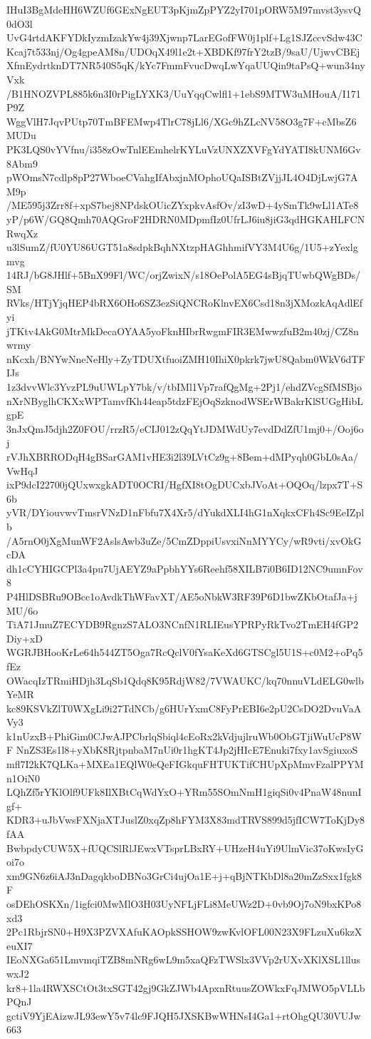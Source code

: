 IHuI3BgMdeHH6WZUf6GExNgEUT3pKjmZpPYZ2yI701pORW5M97mvst3ysvQ0dO3l
UvG4rtdAKFYDkIyzmIzakYw4j39Xjwnp7LarEGofFW0j1plf+Lg1SJZccvSdw43C
Kcaj7t533nj/Og4gpeAM8n/UDOqX49l1e2t+XBDKf97frY2tzB/9saU/UjwvCBEj
XfmEydrtknDT7NR540S5qK/kYc7FmmFvucDwqLwYqaUUQin9taPsQ+wun34nyVxk
/B1HNOZVPL885k6n3I0rPigLYXK3/UuYqqCwlfl1+1ebS9MTW3uMHouA/I171P9Z
WggVlH7JqvPUtp70TmBFEMwp4TlrC78jLl6/XGc9hZLcNV58O3g7F+cMbsZ6MUDu
PK3LQS0vYVfnu/i358zOwTnlEEmhelrKYLuVzUNXZXVFgYdYATI8kUNM6Gv8Abm9
pWOmsN7cdlp8pP27WboeCVahgIfAbxjnMOphoUQaISBtZVjjJL4O4DjLwjG7AM9p
/ME595j3Zrr8f+xpS7bej8NPdskOUicZYxpkvAsfOv/zI3wD+4ySmTk9wLl1ATe8
yP/p6W/GQ8Qmh70AQGroF2HDRN0MDpmfIz0UfrLJ6iu8jiG3qdHGKAHLFCNRwqXz
u3lSumZ/fU0YU86UGT51a8sdpkBqhNXtzpHAGhhmifVY3M4U6g/1U5+zYexlgmvg
14RJ/bG8JHlf+5BnX99Fl/WC/orjZwixN/s18OePolA5EG4sBjqTUwbQWgBDs/SM
RVks/HTjYjqHEP4bRX6OHo6SZ3ezSiQNCRoKlnvEX6Csd18n3jXMozkAqAdlEfyi
jTKtv4AkG0MtrMkDecaOYAA5yoFknHIbrRwgmFIR3EMwwzfuB2m40zj/CZ8nwrmy
nKcxh/BNYwNneNeHly+ZyTDUXtfuoiZMH10IhiX0pkrk7jwU8Qabm0WkV6dTFIJs
1z3dvvWlc3YvzPL9uUWLpY7bk/v/tbIMl1Vp7rafQgMg+2Pj1/ehdZVcgSfMSBjo
nXrNByglhCKXxWPTamvfKh44eap5tdzFEjOqSzknodWSErWBakrKlSUGgHibLgpE
3nJxQmJ5djh2Z0FOU/rrzR5/eCIJ012zQqYtJDMWdUy7evdDdZfU1mj0+/Ooj6oj
rVJhXBRRODqH4gBSarGAM1vHE3i2l39LVtCz9g+8Bem+dMPyqh0GbL0sAa/VwHqJ
ixP9dcI22700jQUxwxgkADT0OCRI/HgfXI8tOgDUCxbJVoAt+OQOq/lzpx7T+S6b
yVR/DYiouvwvTmsrVNzD1nFbfu7X4Xr5/dYukdXLI4hG1nXqkxCFh4Sc9EeIZplb
/A5rnO0jXgMunWF2AslsAwb3uZe/5CmZDppiUsvxiNnMYYCy/wR9vti/xvOkGcDA
dh1cCYHIGCPl3a4pu7UjAEYZ9aPpbhYYs6Reehf58XILB7i0B6ID12NC9umnFov8
P4HlDSBRu9OBcc1oAvdkThWFavXT/AE5oNbkW3RF39P6D1bwZKbOtafJa+jMU/6o
TiA71JmuZ7ECYDB9RgnzS7ALO3NCnfN1RLIEusYPRPyRkTvo2TmEH4fGP2Diy+xD
WGRJBHooKrLe64h544ZT5Oga7RcQclV0fYsaKeXd6GTSCgl5U1S+c0M2+oPq5fEz
OWacqIzTRmiHDjh3LqSb1Qdq8K95RdjW82/7VWAUKC/kq70nnuVLdELG0wlbYeMR
kc89KSVkZlT0WXgLi9i27TdNCb/g6HUrYxmC8FyPrEBI6e2pU2CsDO2DvuVaAVy3
k1nUzxB+PhiGim0CJwAJPCbrlqSbiql4cEoRx2kVdjujlruWb0ObGTjiWuUcP8WF
NnZS3Es1l8+yXbK8RjtpnbaM7nUi0r1hgKT4Jp2jHIcE7Enuki7fxy1avSgiuxoS
mfl7I2kK7QLKa+MXEa1EQlW0eQeFIGkquFHTUKTifCHUpXpMmvFzalPPYMn1OiN0
LQhZf5rYKlOlf9UFk8IlXBtCqWdYxO+YRm55SOmNmH1giqSi0v4PnaW48nunIgf+
KDR3+uJbVwsFXNjaXTJuslZ0xqZp8hFYM3X83mdTRVS899d5jfICW7ToKjDy8fAA
BwbpdyCUW5X+fUQCSlRlJEwxVTsprLBxRY+UHzeH4uYi9UlmVic37oKwsIyGoi7o
xm9GN6z6iAJ3nDagqkboDBNo3GrCi4ujOa1E+j+qBjNTKbDl8a20mZzSxx1fgk8F
osDEhOSKXn/1igfci0MwMlO3H03UyNFLjFLi8MeUWz2D+0vb9Oj7oN9bxKPo8xd3
2Pc1RbjrSN0+H9X3PZVXAfuKAOpkSSHOW9zwKvlOFL00N23X9FLzuXu6kzXeuXI7
IEoNXGa651LmvmqiTZB8mNRg6wL9m5xaQFzTWSlx3VVp2rUXvXKlXSL1lluswxJ2
kr8+1la4RWXSCtOt3txSGT42gj9GkZJWb4ApxnRtuusZOWkxFqJMWO5pVLLbPQnJ
gctiV9YjEAizwJL93ewY5v74lc9FJQH5JXSKBwWHNsI4Ga1+rtOhgQU30VUJw663
